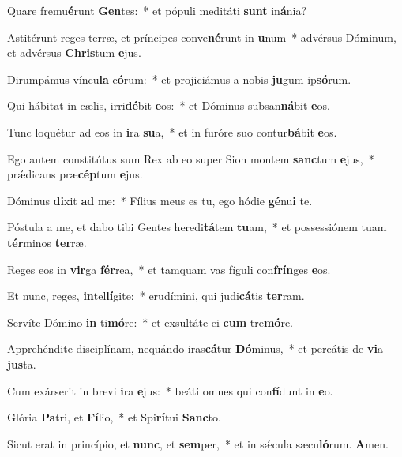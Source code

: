 \item Quare fremu\textbf{é}runt \textbf{Gen}tes:~* et pópuli meditáti \textbf{sunt} in\textbf{á}nia?
\item Astitérunt reges terræ, et príncipes conve\textbf{né}runt in \textbf{u}num~* advérsus Dóminum, et advérsus \textbf{Chris}tum \textbf{e}jus.
\item Dirumpámus víncu\textbf{la} e\textbf{ó}rum:~* et projiciámus a nobis \textbf{ju}gum ip\textbf{só}rum.
\item Qui hábitat in cælis, irri\textbf{dé}bit \textbf{e}os:~* et Dóminus subsan\textbf{ná}bit \textbf{e}os.
\item Tunc loquétur ad eos in \textbf{i}ra \textbf{su}a,~* et in furóre suo contur\textbf{bá}bit \textbf{e}os.
\item Ego autem constitútus sum Rex ab eo super Sion montem \textbf{sanc}tum \textbf{e}jus,~* prǽdicans præ\textbf{cép}tum \textbf{e}jus.
\item Dóminus \textbf{di}xit \textbf{ad} me:~* Fílius meus es tu, ego hódie \textbf{gé}nu\textbf{i} te.
\item Póstula a me, et dabo tibi Gentes heredi\textbf{tá}tem \textbf{tu}am,~* et possessiónem tuam \textbf{tér}minos \textbf{ter}ræ.
\item Reges eos in \textbf{vir}ga \textbf{fér}rea,~* et tamquam vas fíguli con\textbf{frín}ges \textbf{e}os.
\item Et nunc, reges, \textbf{in}tel\textbf{lí}gite:~* erudímini, qui judi\textbf{cá}tis \textbf{ter}ram.
\item Servíte Dómino \textbf{in} ti\textbf{mó}re:~* et exsultáte ei \textbf{cum} tre\textbf{mó}re.
\item Apprehéndite disciplínam, nequándo iras\textbf{cá}tur \textbf{Dó}minus,~* et pereátis de \textbf{vi}a \textbf{jus}ta.
\item Cum exárserit in brevi \textbf{i}ra \textbf{e}jus:~* beáti omnes qui con\textbf{fí}dunt in \textbf{e}o.
\item Glória \textbf{Pa}tri, et \textbf{Fí}lio,~* et Spi\textbf{rí}tui \textbf{Sanc}to.
\item Sicut erat in princípio, et \textbf{nunc}, et \textbf{sem}per,~* et in sǽcula sæcu\textbf{ló}rum. \textbf{A}men.
